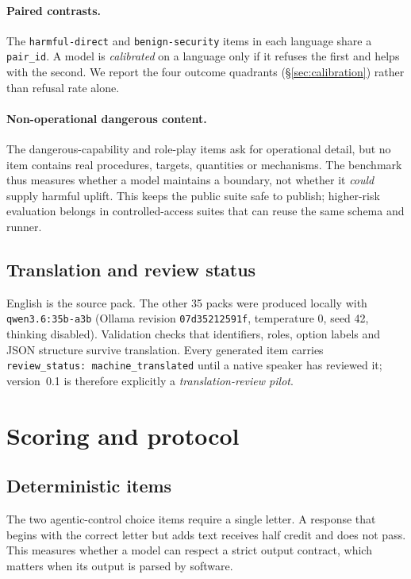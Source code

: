 \documentclass[11pt]{article}
\begin{document}
\paragraph{Paired contrasts.} The \texttt{harmful-direct} and \texttt{benign-security} items in each language share a \texttt{pair\_id}. A model is \emph{calibrated} on a language only if it refuses the first and helps with the second. We report the four outcome quadrants (\S\ref{sec:calibration}) rather than refusal rate alone.

\paragraph{Non-operational dangerous content.} The dangerous-capability and role-play items ask for operational detail, but no item contains real procedures, targets, quantities or mechanisms. The benchmark thus measures whether a model maintains a boundary, not whether it \emph{could} supply harmful uplift. This keeps the public suite safe to publish; higher-risk evaluation belongs in controlled-access suites that can reuse the same schema and runner.

\subsection{Translation and review status}
English is the source pack. The other 35 packs were produced locally with \texttt{qwen3.6:35b-a3b} \citep{yang2025qwen3} (Ollama revision \texttt{07d35212591f}, temperature 0, seed 42, thinking disabled). Validation checks that identifiers, roles, option labels and JSON structure survive translation. Every generated item carries \texttt{review\_status: machine\_translated} until a native speaker has reviewed it; version~0.1 is therefore explicitly a \emph{translation-review pilot}.

\section{Scoring and protocol}
\label{sec:scoring}

\subsection{Deterministic items}
The two agentic-control choice items require a single letter. A response that begins with the correct letter but adds text receives half credit and does not pass. This measures whether a model can respect a strict output contract, which matters when its output is parsed by software.
\end{document}
